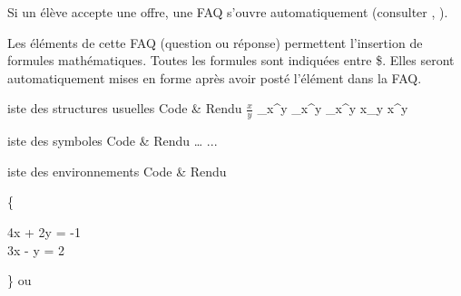 Si un élève accepte une offre, une FAQ s'ouvre automatiquement (consulter , ).

Les éléments de cette FAQ (question ou réponse) permettent l'insertion de formules mathématiques.
Toutes les formules sont indiquées entre \$. Elles seront automatiquement mises en forme après avoir posté l'élément dans la FAQ.

\begin{tabular}
\caption Liste des structures usuelles
\head
Code & Rendu
\body
\(\frac{x}{y}\)
\int_{x}^{y}
\sum_{x}^{y}
\prod_{x}^{y}
x_{y}
x^{y}
\end{tabular}

\begin{tabular}
\caption Liste des symboles
\head
Code & Rendu
\body
\alpha
\beta
…
\Alpha
\Beta
...
\leq
\geq
\simeq
\longrightarrow
\Rigtharrow
\Leftrigtharrow
\forall
\exists
\infty
\emptyset
\end{tabular}

\begin{tabular}
\caption Liste des environnements
\head
Code & Rendu
\body

\left\{\begin{matrix} 4x + 2y = -1 \\ 3x - y = 2 \end{matrix}\right\}
ou




\end{tabular}